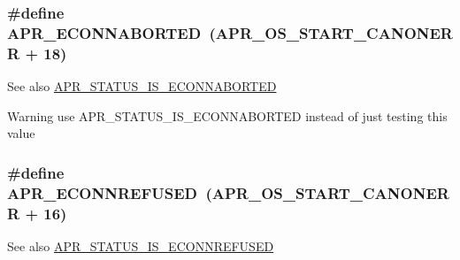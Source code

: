 \subsubsection[{\texorpdfstring{A\+P\+R\+\_\+\+E\+C\+O\+N\+N\+A\+B\+O\+R\+T\+ED}{APR_ECONNABORTED}}]{\setlength{\rightskip}{0pt plus 5cm}\#define A\+P\+R\+\_\+\+E\+C\+O\+N\+N\+A\+B\+O\+R\+T\+ED~({\bf A\+P\+R\+\_\+\+O\+S\+\_\+\+S\+T\+A\+R\+T\+\_\+\+C\+A\+N\+O\+N\+E\+RR} + 18)}\hypertarget{group___a_p_r___error_ga9458da18e0ee46a5d37c9cdfdc43efd2}{}\label{group___a_p_r___error_ga9458da18e0ee46a5d37c9cdfdc43efd2}
\begin{DoxySeeAlso}{See also}
\hyperlink{group___a_p_r___s_t_a_t_u_s___i_s_gaeb76524e9ea3328057bacc81c0095ae8}{A\+P\+R\+\_\+\+S\+T\+A\+T\+U\+S\+\_\+\+I\+S\+\_\+\+E\+C\+O\+N\+N\+A\+B\+O\+R\+T\+ED} 
\end{DoxySeeAlso}
\begin{DoxyWarning}{Warning}
use A\+P\+R\+\_\+\+S\+T\+A\+T\+U\+S\+\_\+\+I\+S\+\_\+\+E\+C\+O\+N\+N\+A\+B\+O\+R\+T\+ED instead of just testing this value 
\end{DoxyWarning}
\subsubsection[{\texorpdfstring{A\+P\+R\+\_\+\+E\+C\+O\+N\+N\+R\+E\+F\+U\+S\+ED}{APR_ECONNREFUSED}}]{\setlength{\rightskip}{0pt plus 5cm}\#define A\+P\+R\+\_\+\+E\+C\+O\+N\+N\+R\+E\+F\+U\+S\+ED~({\bf A\+P\+R\+\_\+\+O\+S\+\_\+\+S\+T\+A\+R\+T\+\_\+\+C\+A\+N\+O\+N\+E\+RR} + 16)}\hypertarget{group___a_p_r___error_ga1b4d1d847bebdfc48af343bc2486ecb8}{}\label{group___a_p_r___error_ga1b4d1d847bebdfc48af343bc2486ecb8}
\begin{DoxySeeAlso}{See also}
\hyperlink{group___a_p_r___s_t_a_t_u_s___i_s_gad261d29d9579a5bbc76fadc03e53f816}{A\+P\+R\+\_\+\+S\+T\+A\+T\+U\+S\+\_\+\+I\+S\+\_\+\+E\+C\+O\+N\+N\+R\+E\+F\+U\+S\+ED} 
\end{DoxySeeAlso}
